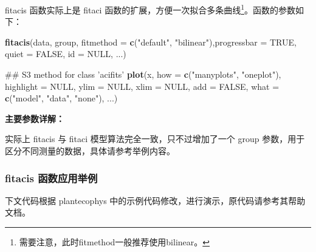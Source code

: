 \documentclass[]{krantz}
\makeatletter
\newenvironment{Shaded}{\begin{snugshade}}{\end{snugshade}}
\newcommand{\KeywordTok}[1]{\textcolor[rgb]{0.13,0.29,0.53}{\textbf{#1}}}
\newcommand{\DataTypeTok}[1]{\textcolor[rgb]{0.13,0.29,0.53}{#1}}
\newcommand{\DecValTok}[1]{\textcolor[rgb]{0.00,0.00,0.81}{#1}}
\newcommand{\StringTok}[1]{\textcolor[rgb]{0.31,0.60,0.02}{#1}}
\newcommand{\CommentTok}[1]{\textcolor[rgb]{0.56,0.35,0.01}{\textit{#1}}}
\newcommand{\OtherTok}[1]{\textcolor[rgb]{0.56,0.35,0.01}{#1}}
\newcommand{\OperatorTok}[1]{\textcolor[rgb]{0.81,0.36,0.00}{\textbf{#1}}}
\newcommand{\NormalTok}[1]{#1}
\newenvironment{kframe}{%
\medskip{}
\setlength{\fboxsep}{.8em}
 \def\at@end@of@kframe{}%
 \ifinner\ifhmode%
  \def\at@end@of@kframe{\end{minipage}}%
  \begin{minipage}{\columnwidth}%
 \fi\fi%
 \def\FrameCommand##1{\hskip\@totalleftmargin \hskip-\fboxsep
 \colorbox{shadecolor}{##1}\hskip-\fboxsep
     \hskip-\linewidth \hskip-\@totalleftmargin \hskip\columnwidth}%
 \MakeFramed {\advance\hsize-\width
   \@totalleftmargin\z@ \linewidth\hsize
   \@setminipage}}%
 {\par\unskip\endMakeFramed%
 \at@end@of@kframe}
\renewenvironment{Shaded}{\begin{kframe}}{\end{kframe}}
\theoremstyle{definition}
\theoremstyle{definition}
\theoremstyle{definition}
\theoremstyle{remark}
\makeatother
\begin{document}
fitacis 函数实际上是 fitaci 函数的扩展，方便一次拟合多条曲线\footnote{需要注意，此时fitmethod一般推荐使用bilinear。}。函数的参数如下：

\begin{Shaded}
\begin{Highlighting}[]
\KeywordTok{fitacis}\NormalTok{(data, group, }\DataTypeTok{fitmethod =} \KeywordTok{c}\NormalTok{(}\StringTok{"default"}\NormalTok{, }
        \StringTok{"bilinear"}\NormalTok{),}\DataTypeTok{progressbar =} \OtherTok{TRUE}\NormalTok{, }
        \DataTypeTok{quiet =} \OtherTok{FALSE}\NormalTok{, }\DataTypeTok{id =} \OtherTok{NULL}\NormalTok{, ...)}

\NormalTok{## S3 method for class 'acifits'}
\KeywordTok{plot}\NormalTok{(x, }\DataTypeTok{how =} \KeywordTok{c}\NormalTok{(}\StringTok{"manyplots"}\NormalTok{, }\StringTok{"oneplot"}\NormalTok{), }
     \DataTypeTok{highlight =} \OtherTok{NULL}\NormalTok{, }\DataTypeTok{ylim =} \OtherTok{NULL}\NormalTok{, }
     \DataTypeTok{xlim =} \OtherTok{NULL}\NormalTok{, }\DataTypeTok{add =} \OtherTok{FALSE}\NormalTok{, }\DataTypeTok{what =} \KeywordTok{c}\NormalTok{(}\StringTok{"model"}\NormalTok{,}
     \StringTok{"data"}\NormalTok{, }\StringTok{"none"}\NormalTok{), ...)}
\end{Highlighting}
\end{Shaded}

\textbf{主要参数详解：}

实际上 fitacis 与 fitaci 模型算法完全一致，只不过增加了一个 group
参数，用于区分不同测量的数据，具体请参考举例内容。

\subsubsection{fitacis 函数应用举例}\label{fitacis-}

下文代码根据 plantecophys
中的示例代码修改，进行演示，原代码请参考其帮助文档。

\begin{Shaded}
\end{Shaded}
\end{document}
